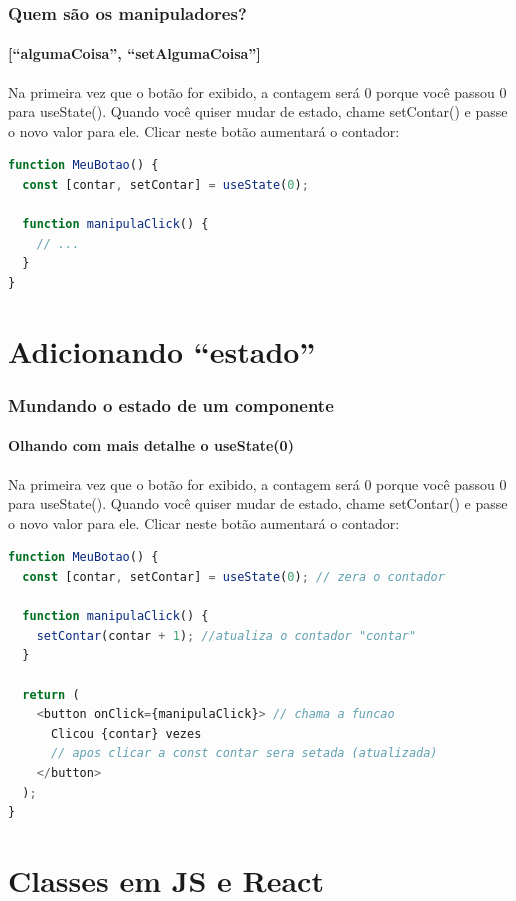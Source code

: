 \documentclass[13pt, xcolor={dvipsnames,svgnames}, portuguese]{beamer}
\begin{document}
\begin{frame}[fragile]
\frametitle{Quem são os manipuladores?}
\framesubtitle{[``algumaCoisa'', ``setAlgumaCoisa'']}

Na primeira vez que o botão for exibido, a contagem será 0 porque você passou 0 para useState(). Quando você quiser mudar de estado, chame setContar() e passe o novo valor para ele. Clicar neste botão aumentará o contador:


\begin{lstlisting}[language=JavaScript]
function MeuBotao() {
  const [contar, setContar] = useState(0);
  
  function manipulaClick() {
    // ...
  }
}
\end{lstlisting}

\end{frame}


\section{Adicionando ``estado''}

\begin{frame}[fragile]
\frametitle{Mundando o estado de um componente}
\framesubtitle{Olhando com mais detalhe o useState(0)}

Na primeira vez que o botão for exibido, a contagem será 0 porque você passou 0 para useState(). Quando você quiser mudar de estado, chame setContar() e passe o novo valor para ele. Clicar neste botão aumentará o contador:
\begin{lstlisting}[language=JavaScript]
function MeuBotao() {
  const [contar, setContar] = useState(0); // zera o contador

  function manipulaClick() {
    setContar(contar + 1); //atualiza o contador "contar"
  }

  return (
    <button onClick={manipulaClick}> // chama a funcao
      Clicou {contar} vezes 
      // apos clicar a const contar sera setada (atualizada)
    </button>
  );
}
\end{lstlisting}

\end{frame}

\section{Classes em JS e React}
\end{document}
